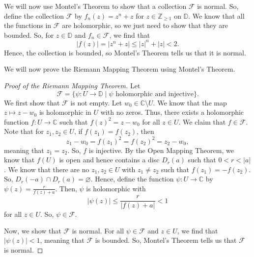 \documentclass[a4paper, openany]{memoir}
\theoremstyle{definition}
\theoremstyle{plain}
\begin{document}
    We will now use Montel's Theorem to show that a collection $\mathcal{F}$ is normal. So, define the collection $\mathcal{F}$ by $f_n(z) = z^n + z$ for $z \in \mathbb{Z}_{\geq 1}$ on $\mathbb{D}$. We know that all the functions in $\mathcal{F}$ are holomorphic, so we just need to show that they are bounded. So, for $z \in \mathbb{D}$ and $f_n \in \mathcal{F}$, we find that
    \[|f(z)| = |z^n + z| \leq |z|^n + |z| < 2.\]
    Hence, the collection is bounded, so Montel's Theorem tells us that it is normal.

    We will now prove the Riemann Mapping Theorem using Montel's Theorem.
    \begin{proof}[Proof of the Riemann Mapping Theorem]
        Let 
        \[\mathcal{F} = \{\psi \colon U \to \mathbb{D} \mid \psi \textrm{ holomorphic and injective}\}.\]
        We first show that $\mathcal{F}$ is not empty. Let $w_0 \in \mathbb{C} \setminus U$. We know that the map $z \mapsto z - w_0$ is holomorphic in $U$ with no zeros. Thus, there exists a holomorphic function $f \colon U \to \mathbb{C}$ such that $f(z)^2 = z - w_0$ for all $z \in U$.
        We claim that $f \in \mathcal{F}$. Note that for $z_1, z_2 \in U$, if $f(z_1) = f(z_2)$, then 
        \[z_1 - w_0 = f(z_1)^2 = f(z_2)^2 = z_2 - w_0,\]
        meaning that $z_1 = z_2$. So, $f$ is injective. By the Open Mapping Theorem, we know that $f(U)$ is open and hence contains a disc $D_r(a)$ such that $0 < r < |a|$. We know that there are no $z_1, z_2 \in U$ with $z_1 \neq z_2$ such that $f(z_1) = -f(z_2)$. So, $D_r(-a) \cap D_r(a) = \varnothing$. Hence, define the function $\psi \colon U \to \mathbb{C}$ by $\psi(z) = \frac{r}{f(z) + a}$. Then, $\psi$ is holomorphic with
        \[|\psi(z)| \leq \frac{r}{|f(z) + a|} < 1\]
        for all $z \in U$. So, $\psi \in \mathcal{F}$.

        Now, we show that $\mathcal{F}$ is normal. For all $\psi \in \mathcal{F}$ and $z \in U$, we find that $|\psi(z)| < 1$, meaning that $\mathcal{F}$ is bounded. So, Montel's Theorem tells us that $\mathcal{F}$ is normal.


\end{proof}
\end{document}
